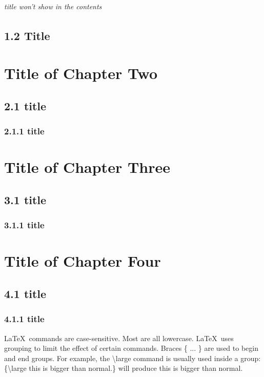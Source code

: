 \documentclass[a4paper,11pt,UTF8,openright]{book}
\begin{document}
\subparagraph{title won't show in the contents}
\lipsum[1-3]

\section{1.2 Title}
\lipsum[1-5]

\chapter{Title of Chapter Two}
\lipsum[1-3]

\section{2.1 title}
\lipsum[1-5]

\subsection{2.1.1 title}
\lipsum[1-5]

\chapter{Title of Chapter Three}
\lipsum[1-3]

\section{3.1 title}
\lipsum[1-5]

\subsection{3.1.1 title}
\lipsum[1-3]

\chapter{Title of Chapter Four}
\lipsum[1-2]

\section{4.1 title}
\lipsum[1-3]

\subsection{4.1.1 title}

\LaTeX\ commands are case-sensitive. Most are all lowercase. \LaTeX\ uses grouping to limit the effect of certain commands. Braces \{ ... \} are used to begin and end groups. For example, the
\textbackslash large command is usually used inside a group: \{\textbackslash large this is bigger than normal.\}  will produce {\large this is bigger than normal.} 
\end{document}
